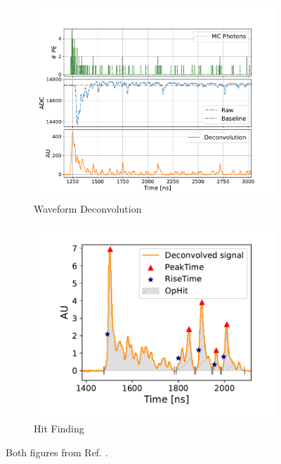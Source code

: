 \begin{figure}[tbp!]
        \centering
        \begin{subfigure}[b]{0.59\textwidth}
            \centering
            \includegraphics[width=\textwidth]{pds_reco_deconvolution}
            \caption{Waveform Deconvolution}
            \label{fig:pds_reco_deconvolution}
        \end{subfigure}
        \hfill
        \begin{subfigure}[b]{0.4\textwidth}  
            \centering 
            \includegraphics[width=\textwidth]{pds_reco_hit_finding}
            \caption{Hit Finding}
            \label{fig:pds_reco_hit_finding}
        \end{subfigure}
        \caption[pds_reco]{
	Both figures from Ref. \cite{}.
	}
        \label{fig:pds_reco}
\end{figure}

